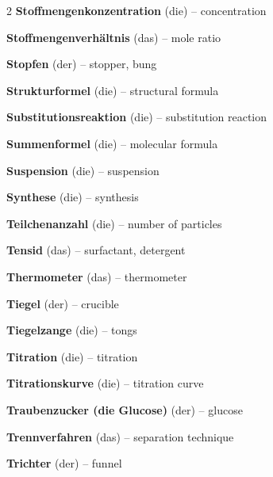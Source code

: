 \begin{multicols}{2}
\textbf{Stoffmengenkonzentration} (die) -- concentration\dotfill\hyperref[e:255]{\pageref*{e:255}}\par
\textbf{Stoffmengenverhältnis} (das) -- mole ratio\dotfill\hyperref[e:259]{\pageref*{e:259}}\par
\textbf{Stopfen} (der) -- stopper, bung\dotfill\hyperref[e:60]{\pageref*{e:60}}\par
\textbf{Strukturformel} (die) -- structural formula\dotfill\hyperref[e:103]{\pageref*{e:103}}\par
\textbf{Substitutionsreaktion} (die) -- substitution reaction\dotfill\hyperref[e:229]{\pageref*{e:229}}\par
\textbf{Summenformel} (die) -- molecular formula\dotfill\hyperref[e:102]{\pageref*{e:102}}\par
\textbf{Suspension} (die) -- suspension\dotfill\hyperref[e:15]{\pageref*{e:15}}\par
\textbf{Synthese} (die) -- synthesis\dotfill\hyperref[e:133]{\pageref*{e:133}}\par

\par\nopagebreak
\textbf{Teilchenanzahl} (die) -- number of particles\dotfill\hyperref[e:251]{\pageref*{e:251}}\par
\textbf{Tensid} (das) -- surfactant, detergent\dotfill\hyperref[e:246]{\pageref*{e:246}}\par
\textbf{Thermometer} (das) -- thermometer\dotfill\hyperref[e:57]{\pageref*{e:57}}\par
\textbf{Tiegel} (der) -- crucible\dotfill\hyperref[e:49]{\pageref*{e:49}}\par
\textbf{Tiegelzange} (die) -- tongs\dotfill\hyperref[e:61]{\pageref*{e:61}}\par
\textbf{Titration} (die) -- titration\dotfill\hyperref[e:173]{\pageref*{e:173}}\par
\textbf{Titrationskurve} (die) -- titration curve\dotfill\hyperref[e:174]{\pageref*{e:174}}\par
\textbf{Traubenzucker (die Glucose)} (der) -- glucose\dotfill\hyperref[e:242]{\pageref*{e:242}}\par
\textbf{Trennverfahren} (das) -- separation technique\dotfill\hyperref[e:30]{\pageref*{e:30}}\par
\textbf{Trichter} (der) -- funnel\dotfill\hyperref[e:44]{\pageref*{e:44}}\par


\end{multicols}
